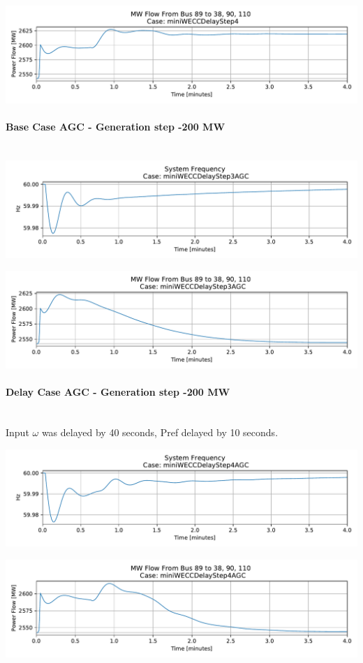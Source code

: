 \documentclass[12pt]{article}
\begin{document}
\includegraphics[width=\linewidth]{figures/miniWECCDelayStep4MWflow89to38-90-110}

\pagebreak

\paragraph{Base Case AGC -   Generation step -200 MW} \ \\

\includegraphics[width=\linewidth]{figures/miniWECCDelayStep3AGCFreq}

\includegraphics[width=\linewidth]{figures/miniWECCDelayStep3AGCMWflow89to38-90-110}

\paragraph{Delay Case AGC -  Generation step -200 MW} \ \\
Input $\omega$ was delayed by 40 seconds, Pref delayed by 10 seconds.

\includegraphics[width=\linewidth]{figures/miniWECCDelayStep4AGCFreq}


\includegraphics[width=\linewidth]{figures/miniWECCDelayStep4AGCMWflow89to38-90-110}
\end{document}
